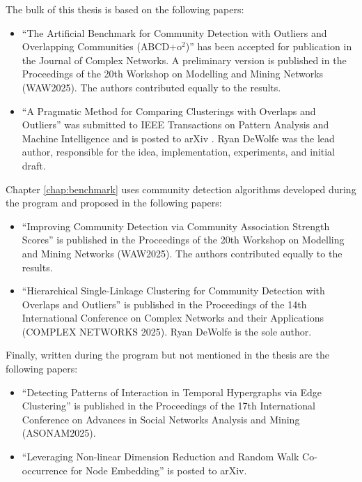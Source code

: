 \documentclass[review,los,12pt]{ryethesis}
\begin{document}
The bulk of this thesis is based on the following papers:
\begin{itemize}
    \item ``The Artificial Benchmark for Community Detection with Outliers and Overlapping Communities ({ABCD}+o$^2$)'' \cite{abcdoo_paper} has been accepted for publication in the Journal of Complex Networks. A preliminary version \cite{abcdoo_conference} is published in the Proceedings of the 20th Workshop on Modelling and Mining Networks (WAW2025). The authors contributed equally to the results.
    \item ``A Pragmatic Method for Comparing Clusterings with Overlaps and Outliers'' was submitted to IEEE Transactions on Pattern Analysis and Machine Intelligence and is posted to arXiv \cite{f*}. Ryan DeWolfe was the lead author, responsible for the idea, implementation, experiments, and initial draft.
\end{itemize}
Chapter \ref{chap:benchmark} uses community detection algorithms developed during the program and proposed in the following papers:
\begin{itemize}
    \item ``Improving Community Detection via Community Association Strength Scores'' \cite{cas} is published in the Proceedings of the 20th Workshop on Modelling and Mining Networks (WAW2025). The authors contributed equally to the results.
    \item ``Hierarchical Single-Linkage Clustering for Community Detection with Overlaps and Outliers'' \cite{hslc} is published in the Proceedings of the 14th International Conference on Complex Networks and their Applications (COMPLEX NETWORKS 2025). Ryan DeWolfe is the sole author.
\end{itemize}
Finally, written during the program but not mentioned in the thesis are the following papers:
\begin{itemize}
    \item ``Detecting Patterns of Interaction in Temporal Hypergraphs via Edge Clustering'' \cite{temporalhyperedgeclustering} is published in the Proceedings of the 17th International Conference on Advances in Social Networks Analysis and Mining (ASONAM2025).
    \item ``Leveraging Non-linear Dimension Reduction and Random Walk Co-occurrence for Node Embedding'' \cite{cove} is posted to arXiv.
\end{itemize}

\end{document}

